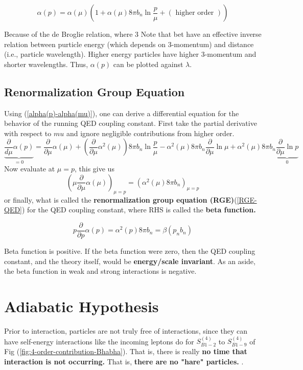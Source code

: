 \begin{qt}
    \begin{equation}\alpha(p)=\alpha(\mu)\left(1+\alpha(\mu) 8 \pi b_{n} \ln \frac{p}{\mu}+(\text { higher order })\right)
    \label{alpha(p)-alpha(mu)}
    \end{equation}
\end{qt}
Because of the de Broglie relation, where 3 Note that bet have an effective inverse relation between purticle energy (which depends on 3-momentum) and distance (i.e., particle wavelength). Higher energy particles have higher 3-momentum and shorter wavelengths. Thus, $\alpha(p)$ can be plotted against $\lambda$.

\subsection{Renormalization Group Equation}
Using (\ref{alpha(p)-alpha(mu)}), one can derive a differential equation for the behavior of the running QED coupling constant. First take the partial derivative with respect to $mu$ and ignore negligible contributions from higher order.
$$
\underbrace{\frac{\partial}{d \mu} \alpha(p)}_{=0}=\frac{\partial}{\partial \mu} \alpha(\mu)+\left(\frac{\partial}{\partial \mu} \alpha^{2}(\mu)\right) 8 \pi b_{n} \ln \frac{p}{\mu}-\alpha^{2}(\mu) 8 \pi b_{n} \frac{\partial}{\partial \mu} \ln \mu+\alpha^{2}(\mu) 8\pi b_{n} \underbrace{\frac{\partial}{\partial \mu} \ln p}_{0}
$$
Now evaluate at $\mu=p$, this give us
$$\left(\mu \frac{\partial}{\partial \mu} \alpha(\mu)\right)_{\mu=p}=\left(\alpha^{2}(\mu) 8 \pi b_{n}\right)_{\mu=p}$$
or finally, what is called the \textbf{renormalization group equation (RGE)}(\ref{RGE-QED}) for the QED coupling constant, where RHS is called the \textbf{beta function.}
\begin{qt}
    \begin{equation}p \frac{\partial}{\partial p} \alpha(p)=\alpha^{2}(p) 8 \pi b_{n}=\beta\left(p_{n} b_{n}\right)
    \label{RGE-QED}
    \end{equation}
\end{qt}
Beta function is positive. If the beta function were zero, then the QED coupling constant, and the theory itself, would be \textbf{energy/scale invariant}. As an aside, the beta function in weak and strong interactions is negative.

\section{Adiabatic Hypothesis}
Prior to interaction, particles are not truly free of interactions, since they can have self-energy interactions like the incoming leptons do for $S_{B 1-2}^{(4)}$ to $S_{B 1-9}^{(4)}$ of Fig (\ref{fig:4-order-contribution-Bhabha}). That is, there is really \textbf{no time that interaction is not occurring.} That is, \textbf{there are no "hare" particles.} .

